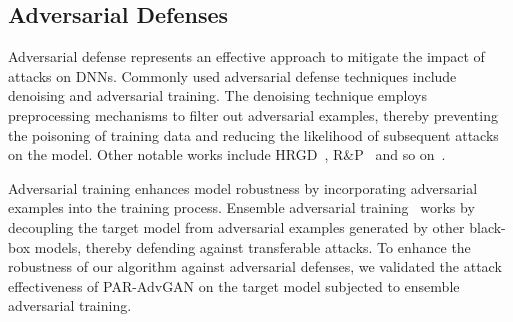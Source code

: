 \subsection{Adversarial Defenses}
Adversarial defense represents an effective approach to mitigate the impact of attacks on DNNs. Commonly used adversarial defense techniques include denoising and adversarial training. The denoising technique employs preprocessing mechanisms to filter out adversarial examples, thereby preventing the poisoning of training data and reducing the likelihood of subsequent attacks on the model. Other notable works include HRGD~\citep{liao2018defense}, R\&P~\citep{xie2017mitigating} and so on~\citep{dziugaite2016study,cohen2019certified}.

Adversarial training enhances model robustness by incorporating adversarial examples into the training process. Ensemble adversarial training~\citep{hang2020ensemble} works by decoupling the target model from adversarial examples generated by other black-box models, thereby defending against transferable attacks. To enhance the robustness of our algorithm against adversarial defenses, we validated the attack effectiveness of PAR-AdvGAN on the target model subjected to ensemble adversarial training.


%